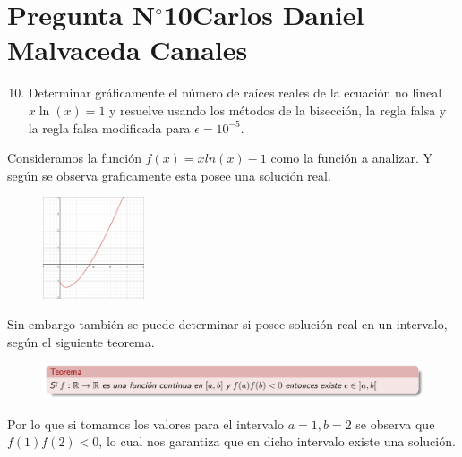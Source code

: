 \section{Pregunta N$^{\circ}$10\qquad Carlos Daniel Malvaceda Canales}

\begin{frame}
	\begin{enumerate}\setcounter{enumi}{9}
		\item

		      Determinar gráficamente el número de raíces reales de la
		      ecuación no lineal
		      \begin{math}
			      x\ln\left(x\right)=
			      1
		      \end{math}
		      y resuelve usando los métodos de la bisección, la regla
		      falsa y la regla falsa modificada para $\epsilon=10^{-5}$.
	\end{enumerate}

	\begin{solution}
            Consideramos la función  \(f(x)=xln(x)-1 \) como la función a analizar. Y según se observa graficamente esta posee una solución real.
		\begin{figure}
			\includegraphics[width=3cm]{p10-grafica.png}
		\end{figure}
            Sin embargo también se puede determinar si posee solución real en un intervalo, según el siguiente teorema.
        \begin{figure}
			\includegraphics[width=12cm]{p10-teorema1.png}
		\end{figure}
              Por lo que si tomamos los valores para el intervalo  \(a=1,b=2\) se observa que \(f(1) f(2) < 0\), lo cual nos garantiza que en dicho intervalo existe una solución.

	\end{solution}
\end{frame}

